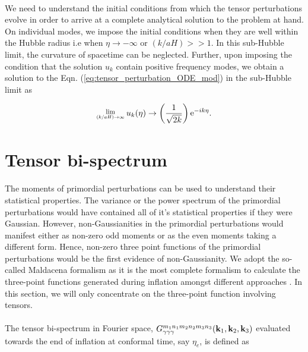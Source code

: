 \documentclass[12pt,a4paper,oneside]{book}
\newcommand{\Lim}[1]{\raisebox{0.5ex}{\scalebox{0.8}{$\displaystyle \lim_{#1}\;$}}}
\begin{document}
\paragraph*{} We need to understand the initial conditions from which the 
tensor perturbations evolve in order to arrive at a complete analytical 
solution to the problem at hand. On individual modes, we impose the 
initial conditions when they are well within the Hubble radius i.e when 
$\eta \rightarrow -\infty$ or $(k/aH) >> 1$. In this sub-Hubble limit, the curvature 
of spacetime can be neglected. Further, upon imposing the condition that the 
solution $u_k$ contain positive frequency modes, we obtain a solution to the 
Eqn. (\ref{eq:tensor_perturbation_ODE_mod}) in the sub-Hubble limit as 

\begin{equation}\label{eq:bunch_davies}
\Lim{\left(k/aH\right) \rightarrow \infty} u_k(\eta) \rightarrow 
\left(\frac{1}{\sqrt{2k}}\right){\rm e}^{-ik\eta}.
\end{equation}

\section{Tensor bi-spectrum}

\paragraph*{} The moments of primordial perturbations can be used to understand 
their statistical properties. The variance or the power spectrum of the primordial 
perturbations would have contained all of it's statistical properties if they were Gaussian. 
However, non-Gaussianities in the primordial perturbations would manifest either as 
non-zero odd moments or as the even moments taking a different form. Hence, non-zero 
three point functions of the primordial perturbations would be the first evidence of 
non-Gaussianity. We adopt the so-called Maldacena formalism as it is the most complete 
formalism to calculate the three-point functions generated during inflation amongst 
different approaches \cite{Maldacena}. In this section, we will only concentrate on the 
three-point function involving tensors.

\paragraph*{} The tensor bi-spectrum in Fourier space, 
$G_{\gamma\gamma\gamma}^{m_1n_1m_2n_2m_3n_3}({\bf k}_1, {\bf k}_2, {\bf k}_3)$ 
evaluated towards the end of 
inflation at conformal time, say $\eta_e$, is defined as \cite{Maldacena, 31, 32, Pi-1, Pi-2}
\end{document}
